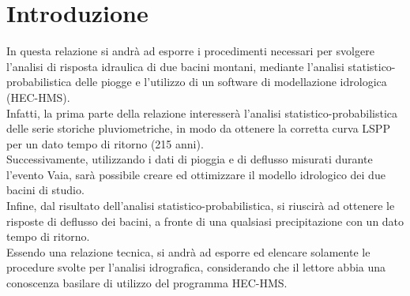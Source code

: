 \section{Introduzione}
In questa relazione si andrà ad esporre i procedimenti necessari per svolgere l'analisi di risposta idraulica di due bacini montani, mediante l'analisi statistico-probabilistica delle piogge e l'utilizzo di un software di modellazione idrologica (HEC-HMS).\\
Infatti, la prima parte della relazione interesserà l'analisi statistico-probabilistica delle serie storiche pluviometriche, in modo da ottenere la corretta curva LSPP per un dato tempo di ritorno (215 anni).\\
Successivamente, utilizzando i dati di pioggia e di deflusso misurati durante l'evento Vaia, sarà possibile creare ed ottimizzare il modello idrologico dei due bacini di studio.\\
Infine, dal risultato dell'analisi statistico-probabilistica, si riuscirà ad ottenere le risposte di deflusso dei bacini, a fronte di una qualsiasi precipitazione con un dato tempo di ritorno.\\
Essendo una relazione tecnica, si andrà ad esporre ed elencare solamente le procedure svolte per l'analisi idrografica, considerando che il lettore abbia una conoscenza basilare di utilizzo del programma HEC-HMS.
